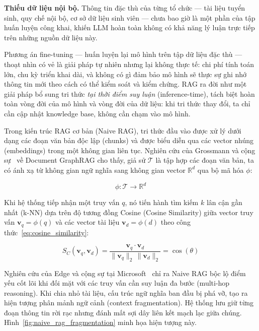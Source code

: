 \documentclass[12pt,a4paper]{report}
\theoremstyle{plain}
\theoremstyle{definition}
\begin{document}
	\textbf{Thiếu dữ liệu nội bộ.} Thông tin đặc thù của từng tổ chức --- tài liệu
	tuyển sinh, quy chế nội bộ, cơ sở dữ liệu sinh viên --- chưa bao giờ là một
	phần của tập huấn luyện công khai, khiến LLM hoàn toàn không có khả năng lý
	luận trực tiếp trên những nguồn dữ liệu này.
	
	Phương án fine-tuning --- huấn luyện lại mô hình trên tập dữ liệu đặc thù ---
	thoạt nhìn có vẻ là giải pháp tự nhiên nhưng lại không thực tế: chi phí tính
	toán lớn, chu kỳ triển khai dài, và không có gì đảm bảo mô hình sẽ thực sự ghi
	nhớ thông tin mới theo cách có thể kiểm soát và kiểm chứng. RAG ra đời như một
	giải pháp bổ sung tri thức \emph{tại thời điểm suy luận} (inference-time), tách
	biệt hoàn toàn vòng đời của mô hình và vòng đời của dữ liệu: khi tri thức thay
	đổi, ta chỉ cần cập nhật knowledge base, không cần chạm vào mô hình.
	
	Trong kiến trúc RAG cơ bản (Naive RAG), tri thức đầu vào được xử lý dưới dạng
	các đoạn văn bản độc lập (chunks) và được biểu diễn qua các vector nhúng
	(embeddings) trong một không gian liên tục. Nghiên cứu của Grossmann và cộng
	sự~\cite{docgraphrag2025} về Document GraphRAG cho thấy, giả sử $\mathcal{T}$
	là tập hợp các đoạn văn bản, ta có ánh xạ từ không gian ngữ nghĩa sang không
	gian vector $\mathbb{R}^d$ qua bộ mã hóa $\phi$:
	
	\begin{equation}
		\phi: \mathcal{T} \to \mathbb{R}^d
		\label{eq:embedding_map}
	\end{equation}
	
	Khi hệ thống tiếp nhận một truy vấn $q$, nó tiến hành tìm kiếm $k$ lân cận
	gần nhất (k-NN) dựa trên độ tương đồng Cosine (Cosine Similarity) giữa vector
	truy vấn $\mathbf{v}_q = \phi(q)$ và các vector tài liệu $\mathbf{v}_d = \phi(d)$
	theo công thức~\eqref{eq:cosine_similarity}:
	
	\begin{equation}
		S_C(\mathbf{v}_q, \mathbf{v}_d)
		= \frac{\mathbf{v}_q \cdot \mathbf{v}_d}
		{\|\mathbf{v}_q\|_2\,\|\mathbf{v}_d\|_2}
		= \cos(\theta)
		\label{eq:cosine_similarity}
	\end{equation}
	
	Nghiên cứu của Edge và cộng sự tại Microsoft~\cite{edge2024local} chỉ ra Naive
	RAG bộc lộ điểm yếu cốt lõi khi đối mặt với các truy vấn cần suy luận đa bước
	(multi-hop reasoning). Khi chia nhỏ tài liệu, cấu trúc ngữ nghĩa ban đầu bị
	phá vỡ, tạo ra hiện tượng phân mảnh ngữ cảnh (context fragmentation). Hệ thống
	lưu giữ từng đoạn thông tin rời rạc nhưng đánh mất sợi dây liên kết mạch lạc
	giữa chúng. Hình~\ref{fig:naive_rag_fragmentation} minh họa hiện tượng này.
	
\end{document}
